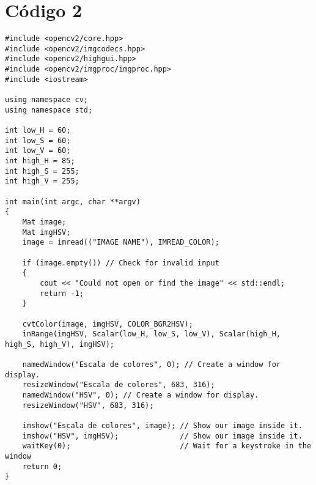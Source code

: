 \section{Código 2}
\begin{lstlisting}
#include <opencv2/core.hpp>
#include <opencv2/imgcodecs.hpp>
#include <opencv2/highgui.hpp>
#include <opencv2/imgproc/imgproc.hpp>
#include <iostream>

using namespace cv;
using namespace std;

int low_H = 60;
int low_S = 60;
int low_V = 60;
int high_H = 85;
int high_S = 255;
int high_V = 255;

int main(int argc, char **argv)
{
    Mat image;
    Mat imgHSV;
    image = imread(("IMAGE NAME"), IMREAD_COLOR);

    if (image.empty()) // Check for invalid input
    {
        cout << "Could not open or find the image" << std::endl;
        return -1;
    }

    cvtColor(image, imgHSV, COLOR_BGR2HSV);
    inRange(imgHSV, Scalar(low_H, low_S, low_V), Scalar(high_H, high_S, high_V), imgHSV);

    namedWindow("Escala de colores", 0); // Create a window for display.
    resizeWindow("Escala de colores", 683, 316);
    namedWindow("HSV", 0); // Create a window for display.
    resizeWindow("HSV", 683, 316);

    imshow("Escala de colores", image); // Show our image inside it.
    imshow("HSV", imgHSV);              // Show our image inside it.
    waitKey(0);                         // Wait for a keystroke in the window
    return 0;
}
\end{lstlisting}